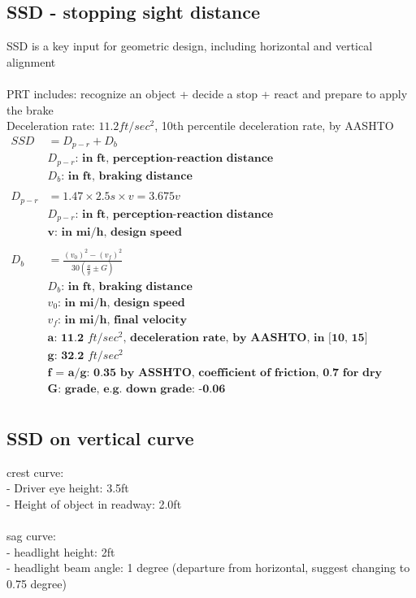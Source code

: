 \documentclass{article}
\begin{document}
  \subsection{SSD - stopping sight distance}
  SSD is a key input for geometric design, including horizontal and vertical alignment \\
  \\
  PRT includes: recognize an object + decide a stop + react and prepare to apply the brake \\
  Deceleration rate: $11.2ft/sec^{2}$, 10th percentile deceleration rate, by AASHTO \\
  \begin{align*}
    SSD & = D_{p-r} + D_{b}\\
        & \textbf{$D_{p-r}$: in ft, perception-reaction distance} \\
        & \textbf{$D_{b}$: in ft, braking distance} \\
        \\
    D_{p-r} & = 1.47 \times 2.5s \times v = 3.675v \\
            & \textbf{$D_{p-r}$: in ft, perception-reaction distance} \\
            & \textbf{v: in mi/h, design speed} \\
            \\
    D_{b} & = \frac{(v_{0})^2 - (v_{f})^2}{30(\frac{a}{g} \pm G)} \\
          & \textbf{$D_{b}$: in ft, braking distance}\\
          & \textbf{$v_{0}$: in mi/h, design speed} \\
          & \textbf{$v_{f}$: in mi/h, final velocity}\\
          & \textbf{a: 11.2 $ft/sec^2$, deceleration rate, by AASHTO, in [10, 15]} \\
          & \textbf{g: 32.2 $ft/sec^2$} \\
          & \textbf{f = a/g: 0.35 by ASSHTO, coefficient of friction, 0.7 for dry roads, 0.3-0.4 for wed roads} \\
          & \textbf{G: grade, e.g. down grade: -0.06} \\
  \end{align*}

  \subsection{SSD on vertical curve}
  crest curve: \\
    - Driver eye height: 3.5ft \\
    - Height of object in readway: 2.0ft \\
    \\
  sag curve: \\
    - headlight height: 2ft \\
    - headlight beam angle: 1 degree (departure from horizontal, suggest changing to 0.75 degree)
\end{document}
